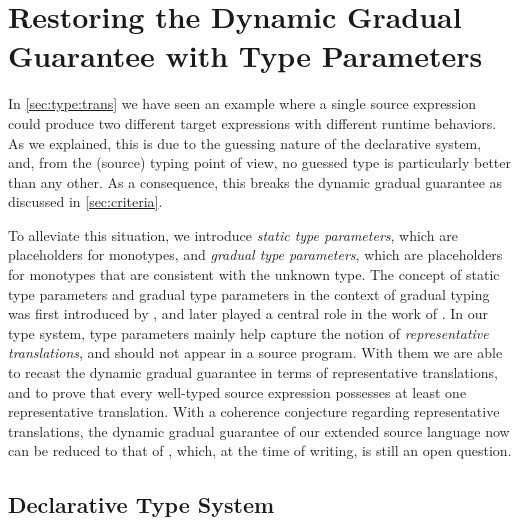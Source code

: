 \section{Restoring the Dynamic Gradual Guarantee with Type Parameters}
\label{sec:advanced-extension}

In \cref{sec:type:trans} we have seen an example where a single source expression could
produce two different target expressions with different runtime behaviors. As we
explained, this is due to the guessing nature of the declarative system, and,
from the (source) typing point of view, no guessed type is particularly better than 
any other. As a consequence, this breaks the dynamic gradual guarantee as discussed in \cref{sec:criteria}.

To alleviate this situation, we introduce \textit{static type parameters}, which
are placeholders for monotypes, and \textit{gradual type parameters}, which are
placeholders for monotypes that are consistent with the unknown type. The
concept of static type parameters and gradual type parameters in the context of
gradual typing was first introduced by \citet{garcia2015principal}, and later
played a central role in the work of \citet{yuu2017poly}. In our type system,
type parameters mainly help capture the notion of \textit{representative
  translations}, and should not appear in a source program.
With them we are able to recast the dynamic gradual guarantee in terms
of representative translations, and to prove that every well-typed source expression
possesses at least one representative translation. With a
coherence conjecture regarding representative translations, the dynamic gradual
guarantee of our extended source language now can be reduced to that of \pbc,
which, at the time of writing, is still an open question.






\subsection{Declarative Type System}
\label{sec:type-param}

